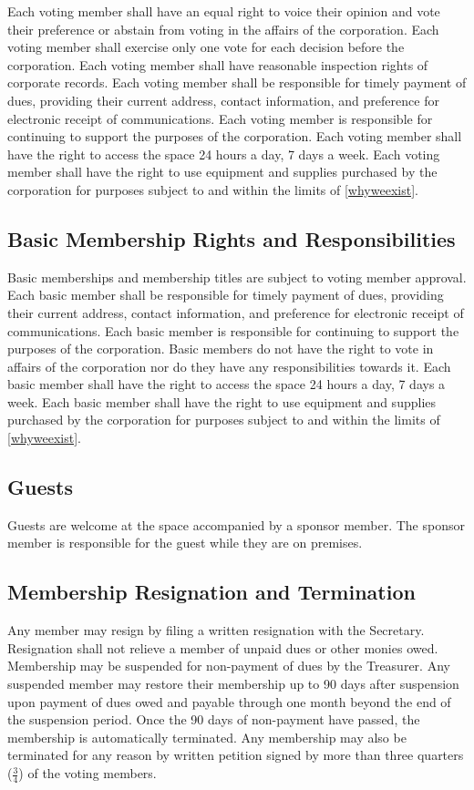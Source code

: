 \documentclass[10pt,letterpaper,titlepage]{article}
\begin{document}
Each voting member shall have an equal right to voice their opinion and vote
their preference or abstain from voting in the affairs of the corporation.
Each voting member shall exercise only one vote for each decision before the
corporation.
Each voting member shall have reasonable inspection rights of corporate
records.
Each voting member shall be responsible for timely payment of dues, providing
their current address, contact information, and preference for electronic
receipt of communications.
Each voting member is responsible for continuing to support the purposes of the
corporation.
Each voting member shall have the right to access the space 24 hours a day, 7
days a week.
Each voting member shall have the right to use equipment and supplies purchased
by the corporation for purposes subject to and within the limits of
\ref{whyweexist}.


\subsection{Basic Membership Rights and Responsibilities}
Basic memberships and membership titles are subject to voting member
approval.
Each basic member shall be responsible for timely payment of dues, providing
their current address, contact information, and preference for electronic
receipt of communications.
Each basic member is responsible for continuing to support the purposes of the
corporation.
Basic members do not have the right to vote in affairs of the corporation
nor do they have any responsibilities towards it.
Each basic member shall have the right to access the space 24 hours a day, 7
days a week.
Each basic member shall have the right to use equipment and supplies purchased
by the corporation for purposes subject to and within the limits of
\ref{whyweexist}.

\subsection{Guests}
Guests are welcome at the space accompanied by a sponsor member.  The sponsor
member is responsible for the guest while they are on premises.

\subsection{Membership Resignation and Termination}

Any member may resign by filing a written resignation with the
Secretary.
Resignation shall not relieve a member of unpaid dues or other monies
owed.
Membership may be suspended for non-payment of dues by the Treasurer.
Any suspended member may restore their membership up to 90 days after
suspension upon payment of dues owed and payable through one month beyond the
end of the suspension period.
Once the 90 days of non-payment have passed, the membership is automatically
terminated.
Any membership may also be terminated for any reason by written petition
signed by more than three quarters ($\frac{3}{4}$) of the voting members.
\end{document}

